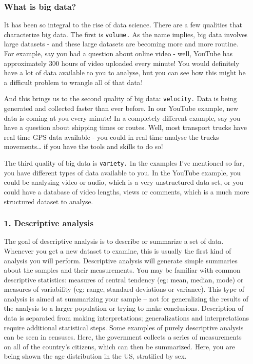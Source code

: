 \documentclass[
]{book}
\begin{document}
\hypertarget{what-is-big-data}{%
\subsubsection{What is big data?}\label{what-is-big-data}}

It has been so integral to the rise of data science. There are a few qualities that characterize big data. The first is \texttt{volume.} As the name implies, big data involves large datasets - and these large datasets are becoming more and more routine. For example, say you had a question about online video - well, YouTube has approximately 300 hours of video uploaded every minute! You would definitely have a lot of data available to you to analyse, but you can see how this might be a difficult problem to wrangle all of that data!

And this brings us to the second quality of big data: \texttt{velocity.} Data is being generated and collected faster than ever before. In our YouTube example, new data is coming at you every minute! In a completely different example, say you have a question about shipping times or routes. Well, most transport trucks have real time GPS data available - you could in real time analyse the trucks movements\ldots{} if you have the tools and skills to do so!

The third quality of big data is \texttt{variety.} In the examples I've mentioned so far, you have different types of data available to you. In the YouTube example, you could be analysing video or audio, which is a very unstructured data set, or you could have a database of video lengths, views or comments, which is a much more structured dataset to analyse.

\hypertarget{descriptive-analysis}{%
\subsubsection{1. Descriptive analysis}\label{descriptive-analysis}}

The goal of descriptive analysis is to describe or summarize a set of data. Whenever you get a new dataset to examine, this is usually the first kind of analysis you will perform. Descriptive analysis will generate simple summaries about the samples and their measurements. You may be familiar with common descriptive statistics: measures of central tendency (eg: mean, median, mode) or measures of variability (eg: range, standard deviations or variance).
This type of analysis is aimed at summarizing your sample -- not for generalizing the results of the analysis to a larger population or trying to make conclusions. Description of data is separated from making interpretations; generalizations and interpretations require additional statistical steps.
Some examples of purely descriptive analysis can be seen in censuses. Here, the government collects a series of measurements on all of the country's citizens, which can then be summarized. Here, you are being shown the age distribution in the US, stratified by sex.
\end{document}
